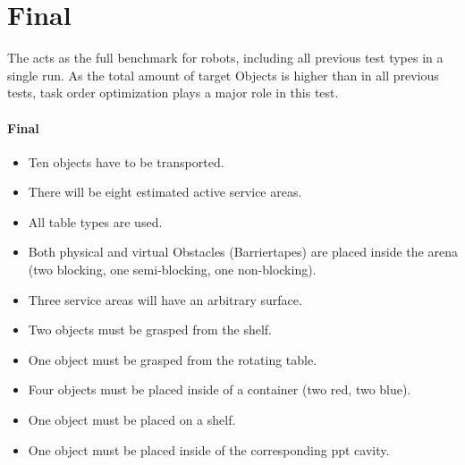 \section{Final}
\label{sec:Final}

The  acts as the full benchmark for robots, including all previous test types in a single run.
As the total amount of target Objects is higher than in all previous tests, task order optimization plays a major role in this test.

\paragraph{Final}
\begin{itemize}
\item Ten objects have to be transported.
\item There will be eight estimated active service areas.
\item All table types are used.
\item Both physical and virtual Obstacles (Barriertapes) are placed inside the arena (two blocking, one semi-blocking, one non-blocking).
\item Three service areas will have an arbitrary surface.
\item Two objects must be grasped from the shelf.
\item One object must be grasped from the rotating table.
\item Four objects must be placed inside of a container (two red, two blue). 
\item One object must be placed on a shelf.
\item One object must be placed inside of the corresponding ppt cavity.
\end{itemize}


